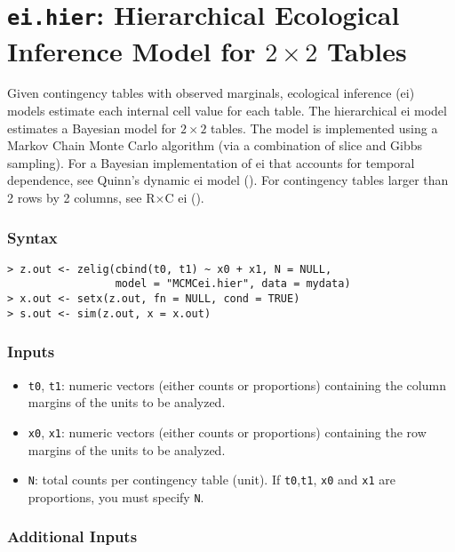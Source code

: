 \section{{\tt ei.hier}: Hierarchical Ecological Inference Model for
$2 \times 2$ Tables} \label{ei.hier}

Given contingency tables with observed marginals, ecological inference
({\sc ei}) models estimate each internal cell value for each table.
The hierarchical {\sc ei} model estimates a Bayesian model for $2
\times 2$ tables.  The model is implemented using a Markov Chain Monte
Carlo algorithm (via a combination of slice and Gibbs sampling).  
For a Bayesian implementation of {\sc ei} that accounts for temporal
dependence, see Quinn's dynamic {\sc ei} model ().
For contingency tables larger than
2 rows by 2 columns, see R$\times$C {\sc ei} (). 

\subsubsection{Syntax}
\begin{verbatim}
> z.out <- zelig(cbind(t0, t1) ~ x0 + x1, N = NULL, 
                 model = "MCMCei.hier", data = mydata)
> x.out <- setx(z.out, fn = NULL, cond = TRUE)
> s.out <- sim(z.out, x = x.out)
\end{verbatim}

\subsubsection{Inputs}

\begin{itemize}
\item \texttt{t0}, {\tt t1}: numeric vectors (either counts or
proportions) containing the column margins of the units to be
analyzed.

\item \texttt{x0}, {\tt x1}: numeric vectors (either counts or
proportions) containing the row margins of the units to be
analyzed.

\item \texttt{N}: total counts per contingency table (unit).  If
\texttt{t0},\texttt{t1}, \texttt{x0} and \texttt{x1} are proportions,
you must specify \texttt{N}. 

\end{itemize}

\subsubsection{Additional Inputs}


